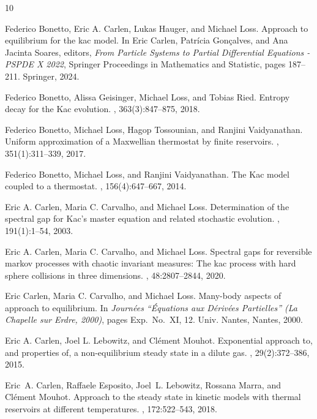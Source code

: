 \documentclass{article}
\begin{document}
\begin{thebibliography}{10}
	
	Federico Bonetto, {Eric A.} Carlen, Lukas Hauger, and Michael Loss.
	\newblock Approach to equilibrium for the kac model.
	\newblock In Eric Carlen, Patr{\'i}cia Gon{\c c}alves, and {Ana Jacinta}
	Soares, editors, {\em From Particle Systems to Partial Differential Equations
		- PSPDE X 2022}, Springer Proceedings in Mathematics and Statistic, pages
	187--211. Springer, 2024.
	
	Federico Bonetto, Alissa Geisinger, Michael Loss, and Tobias Ried.
	\newblock Entropy decay for the {K}ac evolution.
	, 363(3):847--875, 2018.
	
	Federico Bonetto, Michael Loss, Hagop Tossounian, and Ranjini Vaidyanathan.
	\newblock Uniform approximation of a {M}axwellian thermostat by finite
	reservoirs.
	, 351(1):311--339, 2017.
	
	Federico Bonetto, Michael Loss, and Ranjini Vaidyanathan.
	\newblock The {K}ac model coupled to a thermostat.
	, 156(4):647--667, 2014.
	
	Eric A. Carlen, Maria C. Carvalho, and Michael Loss.
	\newblock Determination of the spectral gap for {K}ac's master equation and
	related stochastic evolution.
	, 191(1):1--54, 2003.
	
	Eric A. Carlen, Maria C. Carvalho, and Michael Loss.
	\newblock Spectral gaps for reversible markov processes with chaotic invariant
	measures: The kac process with hard sphere collisions in three dimensions.
	, 48:2807--2844, 2020.
	
	Eric Carlen, Maria C. Carvalho, and Michael Loss.
	\newblock Many-body aspects of approach to equilibrium.
	\newblock In {\em Journ\'ees ``\'{E}quations aux {D}\'eriv\'ees {P}artielles''
		({L}a {C}hapelle sur {E}rdre, 2000)}, pages Exp.\ No.\ XI, 12. Univ. Nantes,
	Nantes, 2000.
	
	Eric A. Carlen, Joel L. Lebowitz, and Cl{\'e}ment Mouhot.
	\newblock Exponential approach to, and properties of, a non-equilibrium steady
	state in a dilute gas.
	,
	29(2):372--386, 2015.
	
	Eric~A. Carlen, Raffaele Esposito, Joel~L. Lebowitz, Rossana Marra, and
	Cl{\'e}ment Mouhot.
	\newblock Approach to the steady state in kinetic models with thermal
	reservoirs at different temperatures.
	, 172:522--543, 2018.
	

\end{thebibliography}
\end{document}
